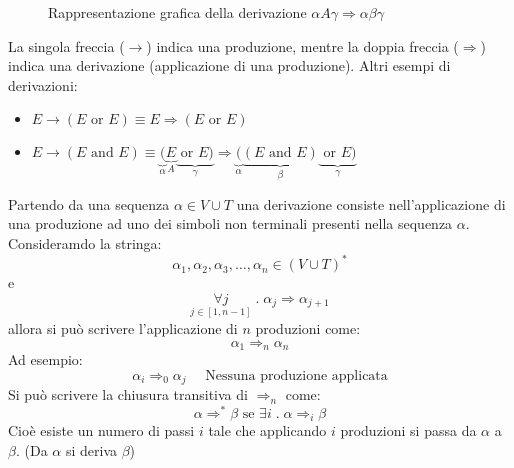 \documentclass[a4paper]{article}
\begin{document}
\begin{example}
\begin{figure}[H]
    \caption{Rappresentazione grafica della derivazione \( \alpha A \gamma \Rightarrow
      \alpha \beta \gamma \)}
  \end{figure}
  \noindent
  La singola freccia (\( \to  \)) indica una produzione, mentre la doppia freccia
  (\( \Rightarrow \)) indica una derivazione (applicazione di una produzione).
  \noindent
  Altri esempi di derivazioni:
  \begin{itemize}
    \item \( E \to (E \text{ or } E) \equiv E \Rightarrow (E \text{ or } E) \) 
    \item \( E \to (E \text{ and } E) \equiv
      \underbrace{(}_{\alpha}\underbrace{E}_{A} \underbrace{\text{ or } E)}_{\gamma } \Rightarrow
      \underbrace{(}_{\alpha}\underbrace{(E \text{ and } E)}_{\beta} \underbrace{\text{ or } E)}_{\gamma} \)
  \end{itemize}
\end{example}
\begin{definition}[Derivazione]
  Partendo da una sequenza \( \alpha \in V \cup T \) una derivazione consiste nell'applicazione
  di una produzione ad uno dei simboli non terminali presenti nella sequenza \( \alpha \).
  Consideramdo la stringa:
  \[
    \alpha_1, \alpha_2, \alpha_3, \ldots, \alpha_n \in (V \cup T)^*
  \] 
  e
  \[
    \underset{j \in \left[ 1, n-1 \right]}{\forall j} \;.\; \alpha_j \Rightarrow \alpha_{j+1}
  \] 
  allora si può scrivere l'applicazione di \( n \) produzioni come:
  \[
   \alpha_1 \Rightarrow_n \alpha_n
  \] 
  Ad esempio:
  \[
    \alpha_i \Rightarrow_0 \alpha_j \quad \text{ Nessuna produzione applicata}
  \] 
  \vspace{1em}
  \noindent
  Si può scrivere la chiusura transitiva di \( \Rightarrow_n \) come:
  \[
    \alpha \Rightarrow^* \beta \text{ se } \exists i \;.\; \alpha \Rightarrow_i \beta
  \] 
  Cioè esiste un numero di passi \( i \) tale che applicando \( i \) produzioni si passa
  da \( \alpha \) a \( \beta \). (Da \( \alpha \) si deriva \( \beta \))
\end{definition}
\end{document}
